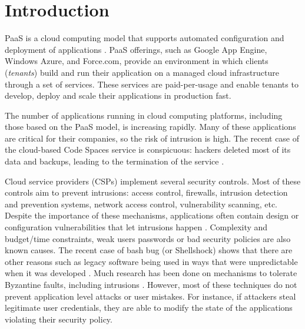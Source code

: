 
\section{Introduction}
\label{sec:introduction}

\acf{PaaS} is a cloud computing model that supports automated configuration and deployment of applications \cite{Vaquero2008,Vaquero2011}. \ac{PaaS} offerings, such as Google App Engine, Windows Azure, and Force.com, provide an environment in which clients (\textit{tenants}) build and run their application on a managed cloud infrastructure through a set of services. These services are paid-per-usage and enable tenants to develop, deploy and scale their applications in production fast.

The number of applications running in cloud computing platforms, including those based on the \ac{PaaS} model, is increasing rapidly. Many of these applications are critical for their companies, so the risk of intrusion is high. The recent case of the cloud-based Code Spaces service is conspicuous: hackers deleted most of its data and backups, leading to the termination of the service \cite{McAllister:14}.


Cloud service providers (CSPs) implement several security controls. Most of these controls aim to prevent intrusions: access control, firewalls, intrusion detection and prevention systems, network access control, vulnerability scanning, etc. Despite the importance of these mechanisms, applications often contain design or configuration vulnerabilities that let intrusions happen \cite{Williams2013}. Complexity and budget/time constraints, weak users passwords or bad security policies are also known causes. The recent case of bash bug (or Shellshock) shows that there are other reasons such as legacy software being used in ways that were unpredictable when it was developed \cite{Sidhpurwala:14}.
Much research has been done on mechanisms to tolerate Byzantine faults, including intrusions \cite{Verissimo2003}. However, most of these techniques do not prevent application level attacks or user mistakes. For instance, if attackers steal legitimate user credentials, they are able to modify the state of the applications violating their security policy. 


